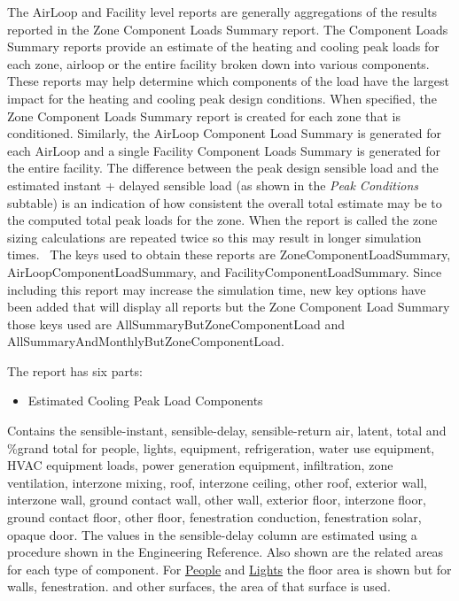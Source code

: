 The AirLoop and Facility level reports are generally aggregations of the results reported in the Zone Component Loads Summary report. The Component Loads Summary reports provide an estimate of the heating and cooling peak loads for each zone, airloop or the entire facility broken down into various components. These reports may help determine which components of the load have the largest impact for the heating and cooling peak design conditions. When specified, the Zone Component Loads Summary report is created for each zone that is conditioned. Similarly, the AirLoop Component Load Summary is generated for each AirLoop and a single Facility Component Loads Summary is generated for the entire facility. The difference between the peak design sensible load and the estimated instant + delayed sensible load (as shown in the \emph{Peak Conditions} subtable) is an indication of how consistent the overall total estimate may be to the computed total peak loads for the zone. When the report is called the zone sizing calculations are repeated twice so this may result in longer simulation times.~ The keys used to obtain these reports are ZoneComponentLoadSummary, AirLoopComponentLoadSummary, and FacilityComponentLoadSummary. Since including this report may increase the simulation time, new key options have been added that will display all reports but the Zone Component Load Summary those keys used are AllSummaryButZoneComponentLoad and AllSummaryAndMonthlyButZoneComponentLoad.

The report has six parts:

\begin{itemize}
\tightlist
\item
  Estimated Cooling Peak Load Components
\end{itemize}

Contains the sensible-instant, sensible-delay, sensible-return air, latent, total and \%grand total for people, lights, equipment, refrigeration, water use equipment, HVAC equipment loads, power generation equipment, infiltration, zone ventilation, interzone mixing, roof, interzone ceiling, other roof, exterior wall, interzone wall, ground contact wall, other wall, exterior floor, interzone floor, ground contact floor, other floor, fenestration conduction, fenestration solar, opaque door. The values in the sensible-delay column are estimated using a procedure shown in the Engineering Reference. Also shown are the related areas for each type of component. For \hyperref[people]{People} and \hyperref[lights-000]{Lights} the floor area is shown but for walls, fenestration. and other surfaces, the area of that surface is used.

